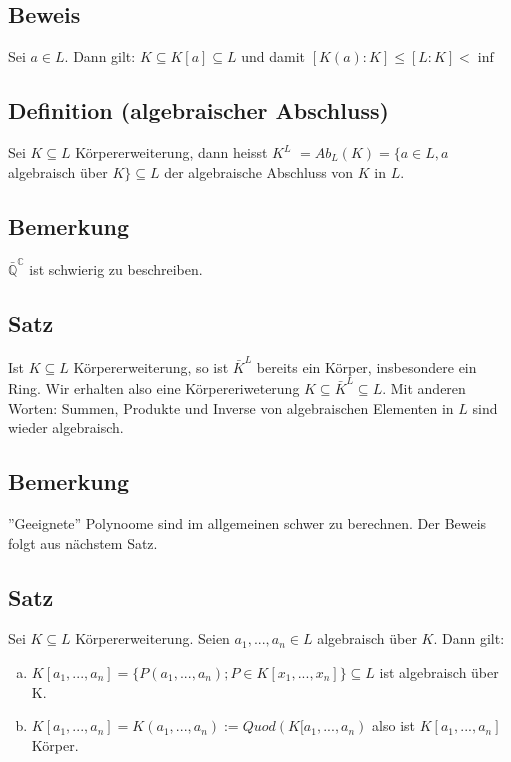 \documentclass[12pt,a4paper,ngerman]{scrreprt}
\begin{document}
\subsection{Beweis}
Sei $a \in L$. Dann gilt: $K \subseteq K[a] \subseteq L$ und damit $[K(a):K] \leq [L:K] < \inf$

\subsection{Definition (algebraischer Abschluss)}
Sei $K \subseteq L$ Körpererweiterung, dann heisst $K^L$ %
$= Ab_L(K) = \{a \in L, a $algebraisch über $K \} \subseteq L$ der algebraische Abschluss von $K$ in $L$.

\subsection{Bemerkung} 
$\bar{\mathbb{Q}}^{\mathbb{C}}$ ist schwierig zu beschreiben. 

\subsection{Satz}
Ist $K \subseteq L$ Körpererweiterung, so ist $\bar{K}^{L}$ bereits ein Körper, insbesondere ein Ring.
Wir erhalten also eine Körpereriweterung $K \subseteq \bar{K}^L \subseteq L$.
Mit anderen Worten: Summen, Produkte und Inverse von algebraischen Elementen in $L$ sind wieder algebraisch.

\subsection{Bemerkung}
''Geeignete'' Polynoome sind im allgemeinen schwer zu berechnen. 
Der Beweis folgt aus nächstem Satz. 

\subsection{Satz}
Sei $K \subseteq L$ Körpererweiterung. Seien $a_1, ..., a_n \in L$ algebraisch über $K$. 
Dann gilt:
\begin{enumerate}[(a)]
\item $K[a_1, ..., a_n] = \{P(a_1, ..., a_n); P \in K[x_1, ..., x_n]\} \subseteq L$ ist algebraisch über K.
\item $K[a_1, ..., a_n] = K(a_1, ..., a_n) := Quod(K[a_1, ..., a_n)$
also ist $K[a_1, ..., a_n]$ Körper.
\end{enumerate}
\end{document}
